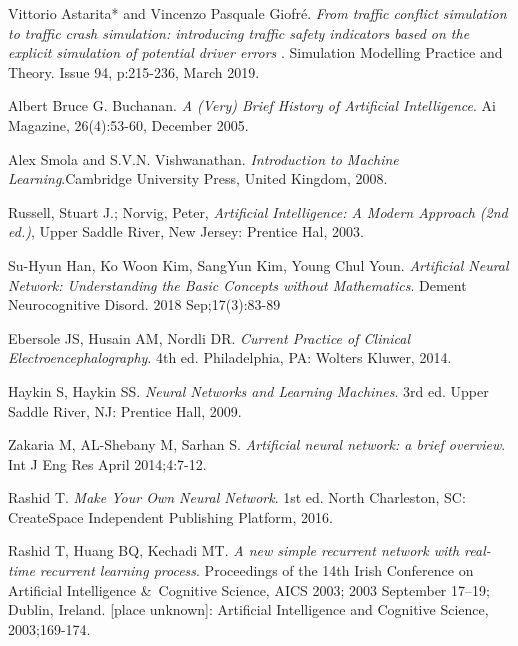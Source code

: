 \documentclass{article}
\begin{document}
\begin{thebibliography}{1}
    Vittorio Astarita* and Vincenzo Pasquale Giofré. 
    \textit{From traffic conflict simulation to traffic crash simulation:  introducing traffic safety indicators based on  the explicit simulation of potential driver errors }. 
    Simulation Modelling Practice and Theory. Issue 94, p:215-236, March 2019.
     
    Albert Bruce G. Buchanan. 
    \textit{A (Very) Brief History of Artificial Intelligence}.
    Ai Magazine, 26(4):53-60, December 2005.
    
    Alex Smola and S.V.N. Vishwanathan. 
    \textit{Introduction to Machine Learning}.Cambridge University Press, United Kingdom, 2008.
    
    Russell, Stuart J.; Norvig, Peter, 
    \textit{Artificial Intelligence: A Modern Approach (2nd ed.)}, Upper Saddle River, New Jersey: Prentice Hal, 2003.
    
    Su-Hyun Han, Ko Woon Kim, SangYun Kim, Young Chul Youn.
    \textit{Artificial Neural Network:
    Understanding the Basic Concepts
    without Mathematics}. Dement Neurocognitive Disord. 2018 Sep;17(3):83-89
    
    Ebersole JS, Husain AM, Nordli DR.
    \textit{Current Practice of Clinical Electroencephalography}. 4th ed. Philadelphia,
    PA: Wolters Kluwer, 2014.
    
    Haykin S, Haykin SS.
    \textit{Neural Networks and Learning Machines}.
     3rd ed. Upper Saddle River, NJ: Prentice Hall, 2009.
     
    Zakaria M, AL-Shebany M, Sarhan S.
    \textit{Artificial neural network: a brief overview}. Int J Eng Res April 2014;4:7-12.
     
    Rashid T. \textit{Make Your Own Neural Network}.
    1st ed. North Charleston, SC: CreateSpace Independent Publishing Platform, 2016.
    
    Rashid T, Huang BQ, Kechadi MT.
    \textit{ A new simple recurrent network with real-time recurrent learning process}. Proceedings of the 14th Irish Conference on Artificial Intelligence \&\ Cognitive Science, AICS
    2003; 2003 September 17–19; Dublin, Ireland. [place unknown]: Artificial Intelligence and Cognitive Science, 2003;169-174.
    

\end{thebibliography}
\end{document}
